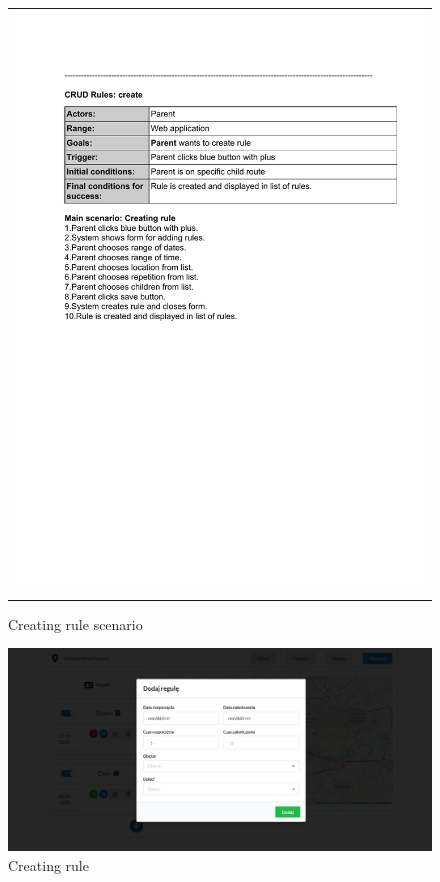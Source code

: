 \documentclass{sprawozdanie-agh}
\begin{document}
		\begin{figure}[H] 
			\centering
			\begin{tabular}{c}
				\includegraphics[width=.80\textwidth]{crR_cropped} 
			\end{tabular} 
		\caption{Creating rule scenario}
		\end{figure}

		\begin{figure}[H]
			\centering
			\includegraphics[width=.80\textwidth]{addRule}
			\caption{Creating rule}
		\end{figure}
\end{document}
